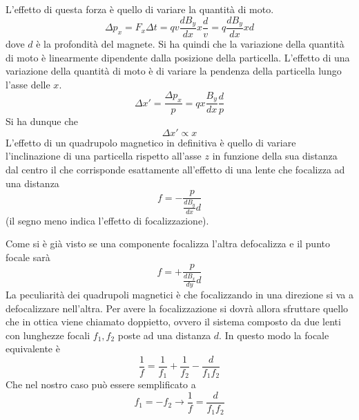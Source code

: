 L'effetto di questa forza è quello di variare la quantità di moto.
\begin{equation}
\Delta p_x=F_x \Delta t=qv\frac{dB_y}{dx}x \frac{d}{v}=q\frac{dB_y}{dx}xd
\end{equation}
dove $d$ è la profondità del magnete.
Si ha quindi che la variazione della quantità di moto è linearmente dipendente dalla posizione della particella.
L'effetto di una variazione della quantità di moto è di variare la pendenza della particella lungo l'asse delle $x$.
\begin{equation}
\Delta x'=\frac{\Delta p_x}{p}=qx \frac{B_y}{dx}\frac{d}{p}
\end{equation}
Si ha dunque che 
\begin{equation}
\Delta x' \propto x
\end{equation}
L'effetto di un quadrupolo magnetico in definitiva è quello di variare l'inclinazione di una particella rispetto all'asse $z$ in funzione della sua distanza dal centro il che corrisponde esattamente all'effetto di una lente che focalizza ad una distanza 
\begin{equation}
f=-\frac{p}{\frac{dB_y}{dx}d}
\end{equation}
(il segno meno indica l'effetto di focalizzazione).

Come si è già visto se una componente focalizza l'altra defocalizza e il punto focale sarà 
\begin{equation}
f=+\frac{p}{\frac{dB_x}{dy}d}
\end{equation}
La peculiarità dei quadrupoli magnetici è che focalizzando in una direzione si va a defocalizzare nell'altra.
Per avere la focalizzazione si dovrà allora sfruttare quello che in ottica viene chiamato doppietto, ovvero il sistema composto da due lenti con lunghezze focali $f_1, f_2$ poste ad una distanza $d$.
In questo modo la focale equivalente è 
\begin{equation}
\frac{1}{f}=\frac{1}{f_1}+\frac{1}{f_2}-\frac{d}{f_1f_2}
\end{equation}
Che nel nostro caso può essere semplificato a 
\begin{equation}
f_1=-f_2\to \frac{1}{f}=\frac{d}{f_1f_2}
\end{equation}

